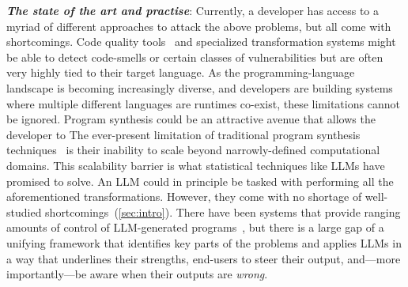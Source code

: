 \documentclass[sigplan,review,anonymous,10pt]{acmart}
\newcommand{\heading}[1]{\vspace{2pt}\noindent\textbf{\emph{#1}}:\enspace}
\begin{document}
\heading{The state of the art and practise}
Currently, a developer has access to a myriad of different approaches 
to attack the above problems, but all come with shortcomings.
Code quality tools~\cite{avgustinov2016ql, Fowler99,Mens04,Myers16} and specialized transformation systems might be able to detect 
code-smells or certain classes of vulnerabilities but are often very highly 
tied to their target language.
As the programming-language landscape is becoming increasingly diverse,
and developers are building systems where multiple different languages are runtimes co-exist,
these limitations cannot be ignored.
Program synthesis could be an attractive avenue that allows 
the developer to 
The ever-present limitation of traditional program synthesis techniques~\cite{jha2010oracle, raza2018disjunctive, singh2016blinkfill,wu2023programming, harp:ccs:2021, yaghmazadeh2018automated} is their 
inability to scale beyond narrowly-defined computational domains.
This scalability barrier is what statistical techniques like LLMs 
have promised to solve.
An LLM could in principle be tasked with performing all the aforementioned transformations.
However, they come with no shortage of well-studied shortcomings~(\cref{sec:intro}).
There have been systems that provide ranging amounts of control of LLM-generated 
programs~\cite{huang2023anplnaturalprogramminginteractive,li2025mccoderstreamliningmotioncontrol,barua2025pygencollaborativehumanaiapproach, tihanyi2025new},
but there is a large gap of a unifying framework that identifies 
key parts of the problems and applies LLMs in a way that underlines their strengths,
end-users to steer their output, and---more importantly---be aware when 
their outputs are \emph{wrong}.


\end{document}
